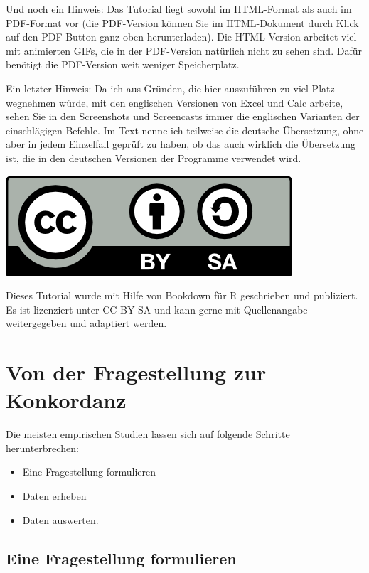 \documentclass[]{article}
\providecommand{\tightlist}{%
  \setlength{\itemsep}{0pt}\setlength{\parskip}{0pt}}
\begin{document}
Und noch ein Hinweis: Das Tutorial liegt sowohl im HTML-Format als auch
im PDF-Format vor (die PDF-Version können Sie im HTML-Dokument durch
Klick auf den PDF-Button ganz oben herunterladen). Die HTML-Version
arbeitet viel mit animierten GIFs, die in der PDF-Version natürlich
nicht zu sehen sind. Dafür benötigt die PDF-Version weit weniger
Speicherplatz.

Ein letzter Hinweis: Da ich aus Gründen, die hier auszuführen zu viel
Platz wegnehmen würde, mit den englischen Versionen von Excel und Calc
arbeite, sehen Sie in den Screenshots und Screencasts immer die
englischen Varianten der einschlägigen Befehle. Im Text nenne ich
teilweise die deutsche Übersetzung, ohne aber in jedem Einzelfall
geprüft zu haben, ob das auch wirklich die Übersetzung ist, die in den
deutschen Versionen der Programme verwendet wird.

\begin{center}\includegraphics[width=0.3\linewidth,height=0.3\textheight]{docs/fig/by-sa} \end{center}

Dieses Tutorial wurde mit Hilfe von Bookdown für R geschrieben und
publiziert. Es ist lizenziert unter CC-BY-SA und kann gerne mit
Quellenangabe weitergegeben und adaptiert werden.

\section{Von der Fragestellung zur
Konkordanz}\label{von-der-fragestellung-zur-konkordanz}

Die meisten empirischen Studien lassen sich auf folgende Schritte
herunterbrechen:

\begin{itemize}
\tightlist
\item
  Eine Fragestellung formulieren
\item
  Daten erheben
\item
  Daten auswerten.
\end{itemize}

\subsection{Eine Fragestellung
formulieren}\label{eine-fragestellung-formulieren}
\end{document}
